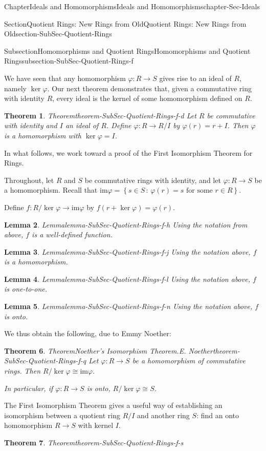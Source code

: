 \documentclass[oneside,10pt,]{book}
\numberwithin{equation}{section}
\def\p{\varphi}
\def\im{\text{im}}
\newcommand{\setof}[2]{{\left\{#1\,\colon\,#2\right\}}}
\newtheorem{theorem}{Theorem}[section]
\newtheorem{lemma}[theorem]{Lemma}
\begin{document}
\begin{chapterptx}{Chapter}{Ideals and Homomorphisms}{}{Ideals and Homomorphisms}{}{}{chapter-Sec-Ideals}
\begin{sectionptx}{Section}{Quotient Rings: New Rings from Old}{}{Quotient Rings: New Rings from Old}{}{}{section-SubSec-Quotient-Rings}
\begin{subsectionptx}{Subsection}{Homomorphisms and Quotient Rings}{}{Homomorphisms and Quotient Rings}{}{}{subsection-SubSec-Quotient-Rings-f}
\par
We have seen that any homomorphism \(\p : R\to S\) gives rise to an ideal of \(R\), namely \(\ker\p\). Our next theorem demonstrates that, given a commutative ring with identity \(R\), every ideal is the kernel of some homomorphism defined on \(R\).%
\begin{theorem}{Theorem}{}{}{theorem-SubSec-Quotient-Rings-f-d}%
Let \(R\) be commutative with identity and \(I\) an ideal of \(R\). Define \(\p: R\to R/I\) by \(\p(r) = r+I\). Then \(\p\) is a homomorphism with \(\ker\p = I\).%
\end{theorem}
In what follows, we work toward a proof of the First Isomorphism Theorem for Rings.%
\par
Throughout, let \(R\) and \(S\) be commutative rings with identity, and let \(\p : R\to S\) be a homomorphism. Recall that \(\im \p = \setof{s\in S}{\p(r) = s\text{ for some } r\in R}\).%
\par
Define \(f: R/\ker \p \to \im \p\) by \(f(r+\ker \p) = \p(r)\).%
\begin{lemma}{Lemma}{}{}{lemma-SubSec-Quotient-Rings-f-h}%
Using the notation from above, \(f\) is a well-defined function.%
\end{lemma}
\begin{lemma}{Lemma}{}{}{lemma-SubSec-Quotient-Rings-f-j}%
Using the notation above, \(f\) is a homomorphism.%
\end{lemma}
\begin{lemma}{Lemma}{}{}{lemma-SubSec-Quotient-Rings-f-l}%
Using the notation above, \(f\) is one-to-one.%
\end{lemma}
\begin{lemma}{Lemma}{}{}{lemma-SubSec-Quotient-Rings-f-n}%
Using the notation above, \(f\) is onto.%
\end{lemma}
We thus obtain the following, due to Emmy Noether:%
\begin{theorem}{Theorem}{Noether's Isomorphism Theorem.}{E. Noether}{theorem-SubSec-Quotient-Rings-f-q}%
%
Let \(\p : R\to S\) be a homomorphism of commutative rings. Then \(R/\ker \p \cong \im \p\).%
\par
In particular, if \(\p : R\to S\) is onto, \(R/\ker \p \cong S\).%
\end{theorem}
The First Isomorphism Theorem gives a useful way of establishing an isomorphism between a quotient ring \(R/I\) and another ring \(S\): find an onto homomorphism \(R\to S\) with kernel \(I\).%
\begin{theorem}{Theorem}{}{}{theorem-SubSec-Quotient-Rings-f-s}%

\end{theorem}
\end{subsectionptx}
\end{sectionptx}
\end{chapterptx}
\end{document}
